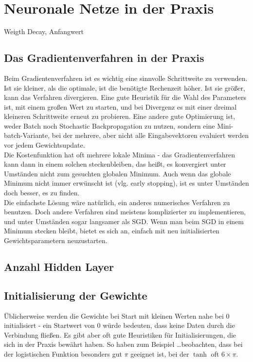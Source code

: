 \section{Neuronale Netze in der Praxis}
Weigth Decay, Anfangwert

\subsection{Das Gradientenverfahren in der Praxis}
Beim Gradientenverfahren ist es wichtig eine sinnvolle Schrittweite zu verwenden. Ist sie kleiner, als die optimale, ist die benötigte Rechenzeit höher. Ist sie größer, kann das Verfahren divergieren. Eine gute Heuristik für die Wahl des Parameters ist, mit einem großen Wert zu starten, und bei Divergenz es mit einer dreimal kleineren Schrittweite erneut zu probieren.
Eine andere gute Optimierung ist, weder Batch noch Stochastic Backpropagation zu nutzen, sondern eine Mini-batch-Variante, bei der mehrere, aber nicht alle Eingabevektoren evaluiert werden vor jedem Gewichtsupdate. \cite{bengio2012practical}\\
Die Kostenfunktion hat oft mehrere lokale Minima - das Gradientenverfahren kann dann in einem solchen steckenbleiben, das heißt, es konvergiert unter Umständen nicht zum gesuchten globalen Minimum. Auch wenn das globale Minimum nicht immer erwünscht ist (vlg. early stopping), ist es unter Umständen doch besser, es zu finden.\\
Die einfachste Lösung wäre natürlich, ein anderes numerisches Verfahren zu benutzen. Doch andere Verfahren sind meistens komplizierter zu implementieren, und unter Umständen sogar langsamer als SGD. Wenn man beim SGD in einem Minimum stecken bleibt, bietet es sich an, einfach mit neu initialisierten Gewichtsparametern neuzustarten.

\subsection{Anzahl Hidden Layer}

\subsection{Initialisierung der Gewichte}
Üblicherweise werden die Gewichte bei Start mit kleinen Werten nahe bei $0$ initialisiert - ein Startwert von $0$ würde bedeuten, dass keine Daten durch die Verbindung fließen. Es gibt aber oft gute Heuristiken für Initialisierungen, die sich in der Praxis bewährt haben. So haben zum Beispiel \ldots beobachten, dass bei der logistischen Funktion besonders gut $\pi$ geeignet ist, bei der $\tanh$ oft $6 \times \pi$.
 

